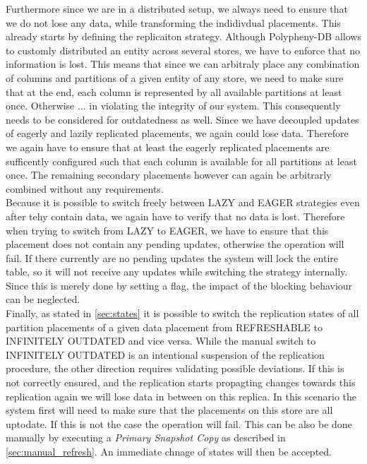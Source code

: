 

Furthermore since we are in a distributed setup, we always need to ensure that we do not lose any data, while transforming the indidivdual placements. 
This already starts by defining the replicaiton strategy. Although Polypheny-DB allows to customly distributed an entity across several stores, we have to enforce that no 
information is lost. This means that since we can arbitraly place any combination of columns and partitions of a given entity of any store, we need to make sure that at the end, 
each column is represented by all available partitions at least once. Otherwise ... in violating the integrity of our system. 
This consequently needs to be considered for outdatedness as well. Since we have decoupled updates of eagerly and lazily replicated placements, we again could lose data. 
Therefore we again have to ensure that at least the eagerly replicated placements are sufficently configured such that each column is available for all partitions at least once.
The remaining secondary placements however can again be arbitrarly combined without any requirements.\\
Because it is possible to switch freely between LAZY and EAGER strategies even after tehy contain data, we again have to verify that no data is lost.
Therefore when trying to switch from LAZY to EAGER, we have to ensure that this placement does not contain any pending updates, otherwise the operation will fail.
If there currently are no pending updates the system will lock the entire table, so it will not receive any updates while switching the strategy internally. 
Since this is merely done by setting a flag, the impact of the blocking behaviour can be neglected.\\

Finally, as stated in \ref{sec:states} it is possible to switch the replication states of all partition placements of a given data placement from REFRESHABLE to 
INFINITELY OUTDATED and vice versa.
While the manual switch to INFINITELY OUTDATED is an intentional suspension of the replication procedure, the other direction requires validating possible deviations.
If this is not correctly ensured, and the replication starts propagting changes towards this replication again we will lose data in between on this replica.
In this scenario the system first will need to make sure that the placements on this store are all uptodate. If this is not the case the operation will fail. 
This can be also be done manually by executing a \emph{Primary Snapshot Copy} as described in \ref{sec:manual_refresh}. An immediate chnage of states will then be accepted.



